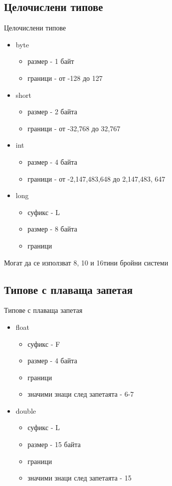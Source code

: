 \documentclass{beamer}
\begin{document}
\subsection{Целочислени типове}
\begin{frame}{Целочислени типове}
  \transdissolve
  \begin{itemize}
  \item byte
    \begin{itemize}
    \item размер - 1 байт
    \item граници - от -128 до 127
    \end{itemize}
  \item short
    \begin{itemize}
    \item размер - 2 байта
    \item граници - от -32,768 до 32,767
    \end{itemize}
  \item int
    \begin{itemize}
      \item размер - 4 байта
      \item граници - от -2,147,483,648 до
        2,147,483, 647
    \end{itemize}
  \item long
    \begin{itemize}
    \item суфикс - L
    \item размер - 8 байта
    \item граници
    \end{itemize}
  \end{itemize}
  Могат да се използват 8, 10 и 16тини
  бройни системи
\end{frame}

\subsection{Типове с плаваща запетая}
\begin{frame}{Типове с плаваща запетая}
  \transdissolve
  \begin{itemize}
  \item float
    \begin{itemize}
    \item суфикс - F
    \item размер - 4 байта
    \item граници
    \item значими знаци след запетаята - 6-7
    \end{itemize}
    \item double
      \begin{itemize}
      \item суфикс - L
      \item размер - 15 байта
      \item граници
      \item значими знаци след запетаята - 15
      \end{itemize}
  \end{itemize}
\end{frame}
\end{document}
